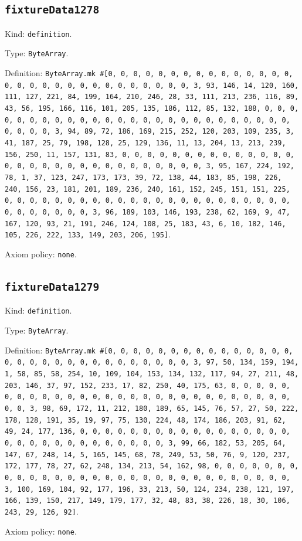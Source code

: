 \documentclass[11pt]{article}
\begin{document}
\subsection*{\texttt{fixtureData1278}}
\noindent Kind: \texttt{definition}.\par
\noindent Type: \texttt{ByteArray}.\par
\noindent Definition: \texttt{ByteArray.mk \#[0, 0, 0, 0, 0, 0, 0, 0, 0, 0, 0, 0, 0, 0, 0, 0, 0, 0, 0, 0, 0, 0, 0, 0, 0, 0, 0, 0, 0, 0, 3, 93, 146, 14, 120, 160, 111, 127, 221, 84, 199, 164, 210, 246, 28, 33, 111, 213, 236, 116, 89, 43, 56, 195, 166, 116, 101, 205, 135, 186, 112, 85, 132, 188, 0, 0, 0, 0, 0, 0, 0, 0, 0, 0, 0, 0, 0, 0, 0, 0, 0, 0, 0, 0, 0, 0, 0, 0, 0, 0, 0, 0, 0, 0, 3, 94, 89, 72, 186, 169, 215, 252, 120, 203, 109, 235, 3, 41, 187, 25, 79, 198, 128, 25, 129, 136, 11, 13, 204, 13, 213, 239, 156, 250, 11, 157, 131, 83, 0, 0, 0, 0, 0, 0, 0, 0, 0, 0, 0, 0, 0, 0, 0, 0, 0, 0, 0, 0, 0, 0, 0, 0, 0, 0, 0, 0, 0, 0, 3, 95, 167, 224, 192, 78, 1, 37, 123, 247, 173, 173, 39, 72, 138, 44, 183, 85, 198, 226, 240, 156, 23, 181, 201, 189, 236, 240, 161, 152, 245, 151, 151, 225, 0, 0, 0, 0, 0, 0, 0, 0, 0, 0, 0, 0, 0, 0, 0, 0, 0, 0, 0, 0, 0, 0, 0, 0, 0, 0, 0, 0, 0, 0, 3, 96, 189, 103, 146, 193, 238, 62, 169, 9, 47, 167, 120, 93, 21, 191, 246, 124, 108, 25, 183, 43, 6, 10, 182, 146, 105, 226, 222, 133, 149, 203, 206, 195]}.\par
\noindent Axiom policy: \texttt{none}.\par
\subsection*{\texttt{fixtureData1279}}
\noindent Kind: \texttt{definition}.\par
\noindent Type: \texttt{ByteArray}.\par
\noindent Definition: \texttt{ByteArray.mk \#[0, 0, 0, 0, 0, 0, 0, 0, 0, 0, 0, 0, 0, 0, 0, 0, 0, 0, 0, 0, 0, 0, 0, 0, 0, 0, 0, 0, 0, 0, 3, 97, 50, 134, 159, 194, 1, 58, 85, 58, 254, 10, 109, 104, 153, 134, 132, 117, 94, 27, 211, 48, 203, 146, 37, 97, 152, 233, 17, 82, 250, 40, 175, 63, 0, 0, 0, 0, 0, 0, 0, 0, 0, 0, 0, 0, 0, 0, 0, 0, 0, 0, 0, 0, 0, 0, 0, 0, 0, 0, 0, 0, 0, 0, 3, 98, 69, 172, 11, 212, 180, 189, 65, 145, 76, 57, 27, 50, 222, 178, 128, 191, 35, 19, 97, 75, 130, 224, 48, 174, 186, 203, 91, 62, 49, 24, 177, 136, 0, 0, 0, 0, 0, 0, 0, 0, 0, 0, 0, 0, 0, 0, 0, 0, 0, 0, 0, 0, 0, 0, 0, 0, 0, 0, 0, 0, 0, 0, 3, 99, 66, 182, 53, 205, 64, 147, 67, 248, 14, 5, 165, 145, 68, 78, 249, 53, 50, 76, 9, 120, 237, 172, 177, 78, 27, 62, 248, 134, 213, 54, 162, 98, 0, 0, 0, 0, 0, 0, 0, 0, 0, 0, 0, 0, 0, 0, 0, 0, 0, 0, 0, 0, 0, 0, 0, 0, 0, 0, 0, 0, 0, 0, 3, 100, 169, 104, 92, 177, 196, 33, 213, 50, 124, 234, 238, 121, 197, 166, 139, 150, 217, 149, 179, 177, 32, 48, 83, 38, 226, 18, 30, 106, 243, 29, 126, 92]}.\par
\noindent Axiom policy: \texttt{none}.\par
\end{document}
